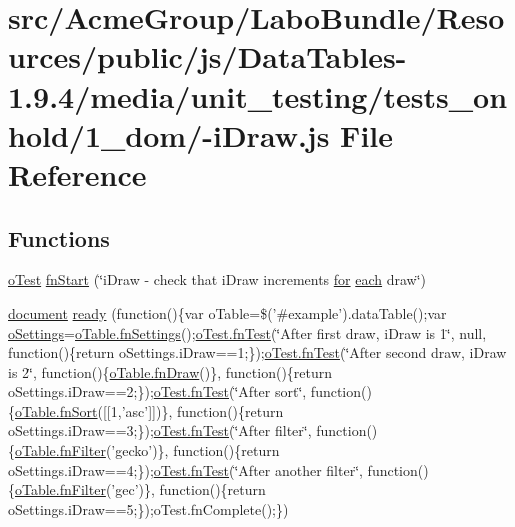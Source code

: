 \hypertarget{1__dom_2-i_draw_8js}{\section{src/\+Acme\+Group/\+Labo\+Bundle/\+Resources/public/js/\+Data\+Tables-\/1.9.4/media/unit\+\_\+testing/tests\+\_\+onhold/1\+\_\+dom/-\/i\+Draw.js File Reference}
\label{1__dom_2-i_draw_8js}
}
\subsection*{Functions}
\begin{DoxyCompactItemize}
\item 
\hyperlink{unit__test_8js_a3b2d259e2df3b6860d9047a92d09d0d6}{o\+Test} \hyperlink{1__dom_2-i_draw_8js_ac498b325be60058f27a9eeb38a5e2140}{fn\+Start} (\char`\"{}i\+Draw -\/ check that i\+Draw increments \hyperlink{tinymce_8jquery_8dev_8js_a4675a875b20881bc5f7011f49fbd4da7}{for} \hyperlink{fullpage_2plugin_8min_8js_a536422939f8cd6b5867a8fb424c3c02e}{each} draw\char`\"{})
\item 
\hyperlink{outside_events_8js_aa14f8e0338cced6720590fd2ea13bd4b}{document} \hyperlink{1__dom_2-i_draw_8js_ae0c9415a0bb40c200b44a0628e5fc04c}{ready} (function()\{var o\+Table=\$('\#example').data\+Table();var \hyperlink{model_8settings_8js_a4857b9c813b4dea010668e9555d0aca7}{o\+Settings}=\hyperlink{api_8methods_8js_a78f387fab92a85c2cb7830bc5d8a6141}{o\+Table.\+fn\+Settings}();\hyperlink{__zero__config__objects__subarrays_8js_a7f100cfe8617a03cd30c47b5e15396a4}{o\+Test.\+fn\+Test}(\char`\"{}After first draw, i\+Draw is 1\char`\"{}, null, function()\{return o\+Settings.\+i\+Draw==1;\});\hyperlink{__zero__config__objects__subarrays_8js_a7f100cfe8617a03cd30c47b5e15396a4}{o\+Test.\+fn\+Test}(\char`\"{}After second draw, i\+Draw is 2\char`\"{}, function()\{\hyperlink{api_8methods_8js_a7d784b06cf5b465f5a7a28de8bcdc97b}{o\+Table.\+fn\+Draw}()\}, function()\{return o\+Settings.\+i\+Draw==2;\});\hyperlink{__zero__config__objects__subarrays_8js_a7f100cfe8617a03cd30c47b5e15396a4}{o\+Test.\+fn\+Test}(\char`\"{}After sort\char`\"{}, function()\{\hyperlink{api_8methods_8js_abd2a0a0641381ef69bfd8ab3f81157e5}{o\+Table.\+fn\+Sort}(\mbox{[}\mbox{[}1,'asc'\mbox{]}\mbox{]})\}, function()\{return o\+Settings.\+i\+Draw==3;\});\hyperlink{__zero__config__objects__subarrays_8js_a7f100cfe8617a03cd30c47b5e15396a4}{o\+Test.\+fn\+Test}(\char`\"{}After filter\char`\"{}, function()\{\hyperlink{api_8methods_8js_a7b6987d0a9ab9c5303d10ef62790885d}{o\+Table.\+fn\+Filter}('gecko')\}, function()\{return o\+Settings.\+i\+Draw==4;\});\hyperlink{__zero__config__objects__subarrays_8js_a7f100cfe8617a03cd30c47b5e15396a4}{o\+Test.\+fn\+Test}(\char`\"{}After another filter\char`\"{}, function()\{\hyperlink{api_8methods_8js_a7b6987d0a9ab9c5303d10ef62790885d}{o\+Table.\+fn\+Filter}('gec')\}, function()\{return o\+Settings.\+i\+Draw==5;\});o\+Test.\+fn\+Complete();\})
\end{DoxyCompactItemize}


